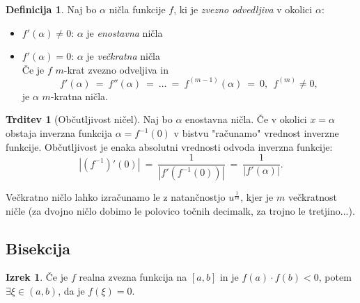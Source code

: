 \documentclass[11pt]{article}
\theoremstyle{definition}
\newtheorem{definicija}{Definicija}[section]
\newtheorem{trditev}{Trditev}
\newtheorem{izrek}{Izrek}
\begin{document}
\begin{definicija}

Naj bo $\alpha$ ničla funkcije $f$, ki je \textit{zvezno odvedljiva} v okolici $\alpha$:
\begin{itemize}

	\item $f'(\alpha) \neq 0$: $\alpha$ je \textit{enostavna} ničla
	
	\item $f'(\alpha) = 0$: $\alpha$ je \textit{večkratna} ničla \\
	
	Če je $f$ $m$-krat zvezno odveljiva in
	$$f'(\alpha) ~=~ f''(\alpha) ~=~ \ldots ~=~ f^{(m-1)}(\alpha) ~=~ 0,~~f^{(m)} \neq 0,$$
	je $\alpha$ $m$-kratna ničla.

\end{itemize}

\end{definicija}
\vspace{0.5cm}

\begin{trditev}[Občutljivost ničel]

Naj bo $\alpha$ enostavna ničla. Če v okolici $x = \alpha$ obstaja inverzna funkcija $\alpha = f^{-1}(0)$ v bistvu "računamo" vrednost inverzne funkcije. Občutljivost je enaka absolutni vrednosti odvoda inverzna funkcije:
$$|(f^{-1})'(0)| ~=~ \frac{1}{|f'(f^{-1}(0))|} ~=~ \frac{1}{|f'(\alpha)|}.$$

Večkratno ničlo lahko izračunamo le z natančnostjo $u^{\frac{1}{m}}$, kjer je $m$ večkratnost ničle (za dvojno ničlo dobimo le polovico točnih decimalk, za trojno le tretjino...). 

\end{trditev}
\vspace{0.5cm}


\subsection{Bisekcija}
\vspace{0.5cm}

\begin{izrek}

Če je $f$ realna zvezna funkcija na $[a, b]$ in je $f(a) \cdot f(b) < 0$, potem $\exists \xi \in (a, b)$, da je $f(\xi) = 0$.

\end{izrek}
\vspace{3cm}
\end{document}
